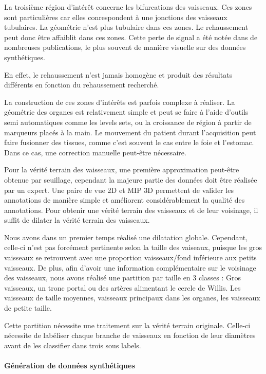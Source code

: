 La troisième région d'intérêt concerne les bifurcations des vaisseaux. Ces zones sont particulières car elles conrespondent à une jonctions des vaisseaux tubulaires. La géométrie n'est plus tubulaire dans ces zones. Le rehaussement peut donc être affaiblit dans ces zones. Cette perte de signal a été notée dans de nombreuses publications, le plus souvent de manière visuelle sur des données synthétiques.

En effet, le rehaussement n'est jamais homogène et produit des résultats différents en fonction du rehaussement recherché.

La construction de ces zones d'intérêts est parfois complexe à réaliser. La géométrie des organes est relativement simple et peut se faire à l'aide d'outils semi automatiques comme les levels sets, ou la croissance de région à partir de marqueurs placés à la main. Le mouvement du patient durant l'acquisition peut faire fusionner des tissues, comme c'est souvent le cas entre le foie et l'estomac. Dans ce cas, une correction manuelle peut-être nécessaire.

Pour la vérité terrain des vaisseaux, une première approximation peut-être obtenue par seuillage, cependant la majeure partie des données doit être réalisée par un expert. Une paire de vue 2D et MIP 3D permettent de valider les annotations de manière simple et améliorent considérablement la qualité des annotations. Pour obtenir une vérité terrain des vaisseaux et de leur voisinage, il suffit de dilater la vérité terrain des vaisseaux.

Nous avons dans un premier temps réalisé une dilatation globale. Cependant, celle-ci n'est pas forcément pertinente selon la taille des vaiseaux, puisque les gros vaisseaux se retrouvent avec une proportion vaisseaux/fond inférieure aux petits vaisseaux. De plus, afin d'avoir une information complémentaire sur le voisinage des vaisseaux, nous avons réalisé une partition par taille en 3 classes : Gros vaisseaux, un tronc portal ou des artères alimentant le cercle de Willis. Les vaisseaux de taille moyennes, vaisseaux principaux dans les organes, les vaisseaux de petite taille.

Cette partition nécessite une traitement sur la vérité terrain originale. Celle-ci nécessite de labéliser chaque branche de vaisseaux en fonction de leur diamètres avant de les classifier dans trois sous labels.

\paragraph{Génération de données synthétiques}

